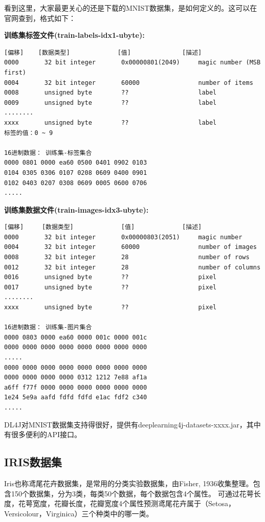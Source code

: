 \noindent
看到这里，大家最更关心的还是下载的MNIST数据集，是如何定义的。这可以在官网查到，格式如下：
\vspace{0.3cm}

\noindent \textbf{训练集标签文件(train-labels-idx1-ubyte):}
\begin{lstlisting}
[偏移]    [数据类型]             [值]              [描述] 
0000       32 bit integer       0x00000801(2049)     magic number (MSB first) 
0004       32 bit integer       60000                number of items 
0008       unsigned byte        ??                   label 
0009       unsigned byte        ??                   label 
........ 
xxxx       unsigned byte        ??                   label
标签的值：0 ~ 9

16进制数据： 训练集-标签集合
0000 0801 0000 ea60 0500 0401 0902 0103
0104 0305 0306 0107 0208 0609 0400 0901
0102 0403 0207 0308 0609 0005 0600 0706
.....
\end{lstlisting}

\noindent \textbf{训练集数据文件(train-images-idx3-ubyte):}
\begin{lstlisting}
[偏移]     [数据类型]             [值]             [描述] 
0000       32 bit integer       0x00000803(2051)     magic number 
0004       32 bit integer       60000                number of images 
0008       32 bit integer       28                   number of rows 
0012       32 bit integer       28                   number of columns 
0016       unsigned byte        ??                   pixel 
0017       unsigned byte        ??                   pixel 
........ 
xxxx       unsigned byte        ??                   pixel

16进制数据： 训练集-图片集合
0000 0803 0000 ea60 0000 001c 0000 001c
0000 0000 0000 0000 0000 0000 0000 0000
.....
0000 0000 0000 0000 0000 0000 0000 0000
0000 0000 0000 0000 0312 1212 7e88 af1a
a6ff f77f 0000 0000 0000 0000 0000 0000
1e24 5e9a aafd fdfd fdfd e1ac fdf2 c340
.....
\end{lstlisting}

DL4J对MNIST数据集支持得很好，提供有deeplearning4j-datasets-xxxx.jar，其中有很多便利的API接口。



\subsection{IRIS数据集}
Iris也称鸢尾花卉数据集，是常用的分类实验数据集，由Fisher, 1936收集整理。包含150个数据集，分为3类，每类50个数据，每个数据包含4个属性。
可通过花萼长度，花萼宽度，花瓣长度，花瓣宽度4个属性预测鸢尾花卉属于（Setosa，Versicolour，Virginica）三个种类中的哪一类。

